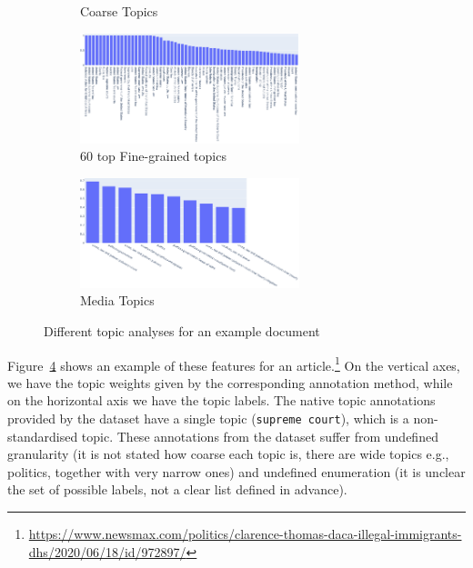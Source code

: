 \begin{figure}
\begin{subfigure}{0.45\textwidth}
		\caption{Coarse Topics} %
            \label{fig:topic_analysis_different_tools_coarse} 
	\end{subfigure}
	\begin{subfigure}{\textwidth} %
		\centering\includegraphics[width=0.7\textwidth]{figures/finegrained_topics.pdf}
		\caption{60 top Fine-grained topics} %
            \label{fig:topic_analysis_different_tools_fine} 
	\end{subfigure}
	\begin{subfigure}{\textwidth} %
		\centering\includegraphics[width=0.7\textwidth]{figures/mediatopics.pdf}
		\caption{Media Topics} %
            \label{fig:topic_analysis_different_tools_mediatopics} 
	\end{subfigure}
    \caption{Different topic analyses for an example document}
    \label{fig:topic_analysis_different_tools} 
\end{figure}

Figure~\ref{fig:topic_analysis_different_tools} shows an example of these features for an article.\footnote{\url{https://www.newsmax.com/politics/clarence-thomas-daca-illegal-immigrants-dhs/2020/06/18/id/972897/}}
On the vertical axes, we have the topic weights given by the corresponding annotation method, while on the horizontal axis we have the topic labels.
The native topic annotations provided by the dataset have a single topic (\texttt{supreme court}), which is a non-standardised topic.
These annotations from the dataset suffer from undefined granularity (it is not stated how coarse each topic is, there are wide topics e.g., politics, together with very narrow ones) and undefined enumeration (it is unclear the set of possible labels, not a clear list defined in advance).

